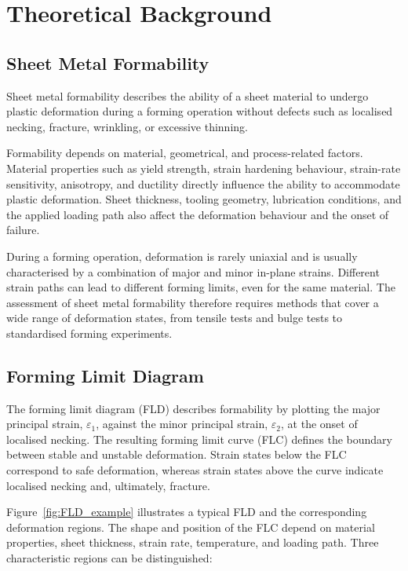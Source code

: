 \chapter{Theoretical Background}\label{chap:theory}
\section{Sheet Metal Formability}
Sheet metal formability describes the ability of a sheet material to undergo
plastic deformation during a forming operation without defects such as localised
necking, fracture, wrinkling, or excessive thinning.

Formability depends on material, geometrical, and process-related factors.
Material properties such as yield strength, strain hardening behaviour,
strain-rate sensitivity, anisotropy, and ductility directly influence the
ability to accommodate plastic deformation. Sheet thickness, tooling geometry,
lubrication conditions, and the applied loading path also affect the deformation
behaviour and the onset of failure.

During a forming operation, deformation is rarely uniaxial and is usually
characterised by a combination of major and minor in-plane strains. Different
strain paths can lead to different forming limits, even for the same material.
The assessment of sheet metal formability therefore requires methods that cover a
wide range of deformation states, from tensile tests and bulge tests to
standardised forming experiments.

\section{Forming Limit Diagram}

The forming limit diagram (FLD) describes formability by plotting the major
principal strain, $\varepsilon_1$, against the minor principal strain,
$\varepsilon_2$, at the onset of localised necking. The resulting forming limit
curve (FLC) defines the boundary between stable and unstable deformation. Strain
states below the FLC correspond to safe deformation, whereas strain states above
the curve indicate localised necking and, ultimately, fracture.

Figure~\ref{fig:FLD_example} illustrates a typical FLD and the corresponding
deformation regions. The shape and position of the FLC depend on material
properties, sheet thickness, strain rate, temperature, and loading path. Three
characteristic regions can be distinguished:

